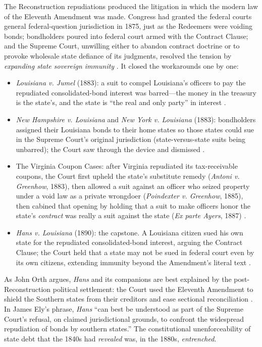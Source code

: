 \documentclass[12pt]{article}
\begin{document}
The Reconstruction repudiations produced the litigation in which the modern law of
the Eleventh Amendment was made. Congress had granted the federal courts general
federal-question jurisdiction in 1875, just as the Redeemers were voiding bonds;
bondholders poured into federal court armed with the Contract Clause; and the
Supreme Court, unwilling either to abandon contract doctrine or to provoke wholesale
state defiance of its judgments, resolved the tension by \emph{expanding state
sovereign immunity} \citep{orth1987judicial}. It closed the workarounds one by one:
\begin{itemize}
  \item \emph{Louisiana v. Jumel} (1883): a suit to compel Louisiana's officers to
    pay the repudiated consolidated-bond interest was barred---the money in the
    treasury is the state's, and the state is ``the real and only party'' in
    interest \citep{jumel1883}.
  \item \emph{New Hampshire v. Louisiana} and \emph{New York v. Louisiana} (1883):
    bondholders assigned their Louisiana bonds to their home states so those states
    could sue in the Supreme Court's original jurisdiction (state-versus-state suits
    being unbarred); the Court saw through the device and dismissed
    \citep{nhlouisiana1883}.
  \item The Virginia Coupon Cases: after Virginia repudiated its tax-receivable
    coupons, the Court first upheld the state's substitute remedy (\emph{Antoni v.
    Greenhow}, 1883), then allowed a suit against an officer who seized property
    under a void law as a private wrongdoer (\emph{Poindexter v. Greenhow}, 1885),
    then cabined that opening by holding that a suit to make officers honor the
    state's \emph{contract} was really a suit against the state (\emph{Ex parte
    Ayers}, 1887) \citep{antoni1883, poindexter1885, ayers1887}.
  \item \emph{Hans v. Louisiana} (1890): the capstone. A Louisiana citizen sued his
    own state for the repudiated consolidated-bond interest, arguing the Contract
    Clause; the Court held that a state may not be sued in federal court even by its
    own citizens, extending immunity beyond the Amendment's literal text
    \citep{hans1890}.
\end{itemize}
As John Orth argues, \emph{Hans} and its companions are best explained by the
post-Reconstruction political settlement: the Court used the Eleventh Amendment to
shield the Southern states from their creditors and ease sectional reconciliation
\citep{orth1987judicial, purcell2003hans, gibbons1983eleventh}. In James Ely's
phrase, \emph{Hans} ``can best be understood as part of the Supreme Court's refusal,
on claimed jurisdictional grounds, to confront the widespread repudiation of bonds
by southern states.'' The constitutional unenforceability of state debt that the
1840s had \emph{revealed} was, in the 1880s, \emph{entrenched}.
\end{document}
